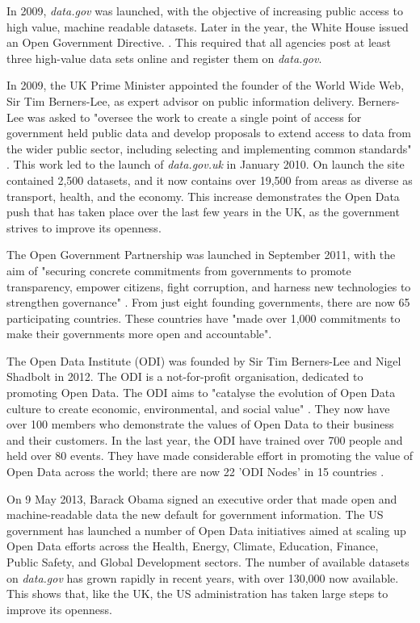 \documentclass[authoryearcitations]{UoYCSproject}
\begin{document}
In 2009, \textit{data.gov} was launched, with the objective of increasing public access to high value, machine readable datasets. Later in the year, the White House issued an Open Government Directive. \citep{Orszag2009}. This required that all agencies post at least three high-value data sets online and register them on \textit{data.gov}.

In 2009, the UK Prime Minister appointed the founder of the World Wide Web, Sir Tim Berners-Lee, as expert advisor on public information delivery. Berners-Lee was asked to "oversee the work to create a single point of access for government held public data and develop proposals to extend access to data from the wider public sector, including selecting and implementing common standards" \citep{CabinetOffice2009}. This work led to the launch of \textit{data.gov.uk} in January 2010. On launch the site contained 2,500 datasets, and it now contains over 19,500 from areas as diverse as transport, health, and the economy. This increase demonstrates the Open Data push that has taken place over the last few years in the UK, as the government strives to improve its openness.

The Open Government Partnership was launched in September 2011, with the aim of "securing concrete commitments from governments to promote transparency, empower citizens, fight corruption, and harness new technologies to strengthen governance" \citep{OpenGovernmentPartnership}. From just eight founding governments, there are now 65 participating countries. These countries have "made over 1,000 commitments to make their governments more open and accountable".

The Open Data Institute (ODI) was founded by Sir Tim Berners-Lee and Nigel Shadbolt in 2012. The ODI is a not-for-profit organisation, dedicated to promoting Open Data. The ODI aims to "catalyse the evolution of Open Data culture to create economic, environmental, and social value" \citep{TheOpenDataInstitute}. They now have over 100 members who demonstrate the values of Open Data to their business and their customers. In the last year, the ODI have trained over 700 people and held over 80 events. They have made considerable effort in promoting the value of Open Data across the world; there are now 22 'ODI Nodes' in 15 countries \citep{TheOpenDataInstitute2015a}.

On 9 May 2013, Barack Obama signed an executive order \citep{TheWhiteHouse-OfficeofthePressSecretary2013} that made open and machine-readable data the new default for government information. The US government has launched a number of Open Data initiatives aimed at scaling up Open Data efforts across the Health, Energy, Climate, Education, Finance, Public Safety, and Global Development sectors. The number of available datasets on \textit{data.gov} has grown rapidly in recent years, with over 130,000 now available. This shows that, like the UK, the US administration has taken large steps to improve its openness.
\end{document}
